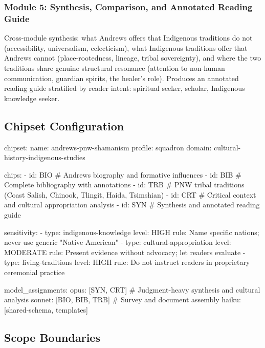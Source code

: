 \documentclass[11pt,letterpaper]{article}
\begin{document}
\subsubsection{Module 5: Synthesis, Comparison, and Annotated Reading Guide}

Cross-module synthesis: what Andrews offers that Indigenous traditions do not (accessibility, universalism, eclecticism), what Indigenous traditions offer that Andrews cannot (place-rootedness, lineage, tribal sovereignty), and where the two traditions share genuine structural resonance (attention to non-human communication, guardian spirits, the healer's role). Produces an annotated reading guide stratified by reader intent: spiritual seeker, scholar, Indigenous knowledge seeker.

\subsection{Chipset Configuration}

\begin{asciibox}
chipset:
  name: andrews-pnw-shamanism
  profile: squadron
  domain: cultural-history-indigenous-studies

  chips:
    - id: BIO         # Andrews biography and formative influences
    - id: BIB         # Complete bibliography with annotations
    - id: TRB         # PNW tribal traditions (Coast Salish, Chinook, Tlingit, Haida, Tsimshian)
    - id: CRT         # Critical context and cultural appropriation analysis
    - id: SYN         # Synthesis and annotated reading guide

  sensitivity:
    - type: indigenous-knowledge
      level: HIGH
      rule: Name specific nations; never use generic "Native American"
    - type: cultural-appropriation
      level: MODERATE
      rule: Present evidence without advocacy; let readers evaluate
    - type: living-traditions
      level: HIGH
      rule: Do not instruct readers in proprietary ceremonial practice

  model_assignments:
    opus:   [SYN, CRT]                # Judgment-heavy synthesis and cultural analysis
    sonnet: [BIO, BIB, TRB]           # Survey and document assembly
    haiku:  [shared-schema, templates]
\end{asciibox}

\subsection{Scope Boundaries}
\end{document}
